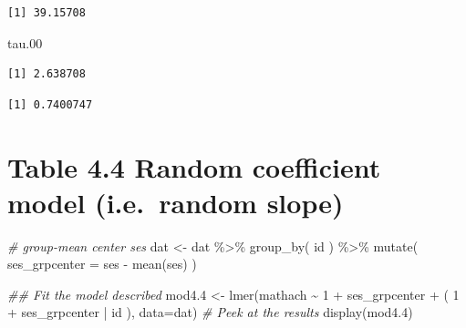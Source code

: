 \documentclass[
  letterpaper,
  DIV=11,
  numbers=noendperiod]{scrreprt}
\newenvironment{Shaded}{\begin{snugshade}}{\end{snugshade}}
\newcommand{\AttributeTok}[1]{\textcolor[rgb]{0.49,0.56,0.16}{#1}}
\newcommand{\CommentTok}[1]{\textcolor[rgb]{0.38,0.63,0.69}{\textit{#1}}}
\newcommand{\DecValTok}[1]{\textcolor[rgb]{0.25,0.63,0.44}{#1}}
\newcommand{\DocumentationTok}[1]{\textcolor[rgb]{0.73,0.13,0.13}{\textit{#1}}}
\newcommand{\FloatTok}[1]{\textcolor[rgb]{0.25,0.63,0.44}{#1}}
\newcommand{\FunctionTok}[1]{\textcolor[rgb]{0.02,0.16,0.49}{#1}}
\newcommand{\NormalTok}[1]{\textcolor[rgb]{0.00,0.44,0.13}{#1}}
\newcommand{\OtherTok}[1]{\textcolor[rgb]{0.00,0.44,0.13}{#1}}
\newcommand{\SpecialCharTok}[1]{\textcolor[rgb]{0.25,0.44,0.63}{#1}}
\begin{document}
\begin{verbatim}
[1] 39.15708
\end{verbatim}

\begin{Shaded}
\begin{Highlighting}[]
\NormalTok{tau}\FloatTok{.00}
\end{Highlighting}
\end{Shaded}

\begin{verbatim}
[1] 2.638708
\end{verbatim}

\begin{Shaded}
\end{Shaded}

\begin{verbatim}
[1] 0.7400747
\end{verbatim}

\hypertarget{table-4.4-random-coefficient-model-i.e.-random-slope}{%
\section{Table 4.4 Random coefficient model (i.e.~random
slope)}\label{table-4.4-random-coefficient-model-i.e.-random-slope}}

\begin{Shaded}
\begin{Highlighting}[]
\CommentTok{\# group{-}mean center ses  }
\NormalTok{dat }\OtherTok{\textless{}{-}}\NormalTok{ dat }\SpecialCharTok{\%\textgreater{}\%} \FunctionTok{group\_by}\NormalTok{( id ) }\SpecialCharTok{\%\textgreater{}\%} 
  \FunctionTok{mutate}\NormalTok{( }\AttributeTok{ses\_grpcenter =}\NormalTok{ ses }\SpecialCharTok{{-}} \FunctionTok{mean}\NormalTok{(ses) )}

\DocumentationTok{\#\# Fit the model described }
\NormalTok{mod4}\FloatTok{.4} \OtherTok{\textless{}{-}} \FunctionTok{lmer}\NormalTok{(mathach }\SpecialCharTok{\textasciitilde{}} \DecValTok{1} \SpecialCharTok{+}\NormalTok{ ses\_grpcenter }\SpecialCharTok{+}\NormalTok{ ( }\DecValTok{1} \SpecialCharTok{+}\NormalTok{ ses\_grpcenter }\SpecialCharTok{|}\NormalTok{ id ), }\AttributeTok{data=}\NormalTok{dat)}
\CommentTok{\# Peek at the results}
\FunctionTok{display}\NormalTok{(mod4}\FloatTok{.4}\NormalTok{)}
\end{Highlighting}
\end{Shaded}
\end{document}
